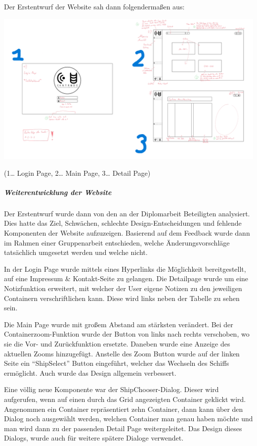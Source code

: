 \documentclass[
    headings=optiontotocandhead,%
    twoside,
    numbers=noenddot,%
    12pt, %
    titlepage, %
    parskip=full, %
    listof=leveldown, 
    numbers=noenddot, %
    a4paper,DIV=14,
    BCOR=15mm,
]{scrbook}
\let\origfigure=\figure
\let\endorigfigure=\endfigure
\renewenvironment{figure}[1][]{%
   \origfigure[H]
}{%
   \endorigfigure
}
\begin{document}
Der Erstentwurf der Website sah dann folgendermaßen aus:

\begin{figure}
\centering
\includegraphics{img/Gekle/DesignV1.png}
\caption{Erste Version des Website-Designs}
\end{figure}

(1\ldots{} Login Page, 2\ldots{} Main Page, 3\ldots{} Detail Page)

\hypertarget{weiterentwicklung-der-website}{%
\subparagraph{Weiterentwicklung der
Website}\label{weiterentwicklung-der-website}}

Der Erstentwurf wurde dann von den an der Diplomarbeit Beteiligten
analysiert. Dies hatte das Ziel, Schwächen, schlechte
Design-Entscheidungen und fehlende Komponenten der Website aufzuzeigen.
Basierend auf dem Feedback wurde dann im Rahmen einer Gruppenarbeit
entschieden, welche Änderungsvorschläge tatsächlich umgesetzt werden und
welche nicht.

In der Login Page wurde mittels eines Hyperlinks die Möglichkeit
bereitgestellt, auf eine Impressum \& Kontakt-Seite zu gelangen. Die
Detailpage wurde um eine Notizfunktion erweitert, mit welcher der User
eigene Notizen zu den jeweiligen Containern verschriftlichen kann. Diese
wird links neben der Tabelle zu sehen sein.

Die Main Page wurde mit großem Abstand am stärksten verändert. Bei der
Containerzoom-Funktion wurde der Button von links nach rechts
verschoben, wo sie die Vor- und Zurückfunktion ersetzte. Daneben wurde
eine Anzeige des aktuellen Zooms hinzugefügt. Anstelle des Zoom Button
wurde auf der linken Seite ein ``ShipSelect'' Button eingeführt, welcher
das Wechseln des Schiffs ermöglicht. Auch wurde das Design allgemein
verbessert.

Eine völlig neue Komponente war der ShipChooser-Dialog. Dieser wird
aufgerufen, wenn auf einen durch das Grid angezeigten Container geklickt
wird. Angenommen ein Container repräsentiert zehn Container, dann kann
über den Dialog noch ausgewählt werden, welchen Container man genau
haben möchte und man wird dann zu der passenden Detail Page
weitergeleitet. Das Design dieses Dialogs, wurde auch für weitere
spätere Dialoge verwendet.
\end{document}
